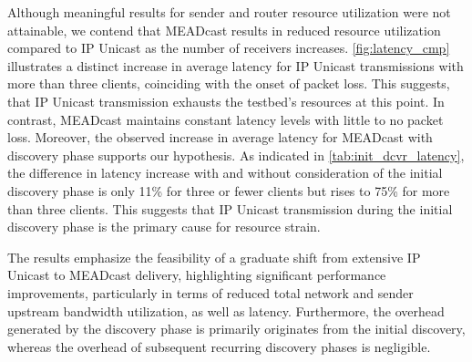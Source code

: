 \begin{itemize}
    Although meaningful results for sender and router resource utilization were
        not attainable, we contend that MEADcast results in reduced resource
        utilization compared to IP Unicast as the number of receivers
        increases.
    \autoref{fig:latency_cmp} illustrates a distinct increase in average
        latency for IP Unicast transmissions with more than three clients,
        coinciding with the onset of packet loss.
    This suggests, that IP Unicast transmission exhausts the testbed's
        resources at this point.
    In contrast, MEADcast maintains constant latency levels with little to no
        packet loss.
    Moreover, the observed increase in average latency for MEADcast with
        discovery phase supports our hypothesis.
    As indicated in \autoref{tab:init_dcvr_latency}, the difference in latency
        increase with and without consideration of the initial discovery phase
        is only 11\% for three or fewer clients but rises to 75\% for more than
        three clients.
    This suggests that IP Unicast transmission during the initial discovery
        phase is the primary cause for resource strain.

    The results emphasize the feasibility of a graduate shift from extensive
        IP Unicast to MEADcast delivery, highlighting significant performance
        improvements, particularly in terms of reduced total network and sender
        upstream bandwidth utilization, as well as latency.
    Furthermore, the overhead generated by the discovery phase is primarily
        originates from the initial discovery, whereas the overhead of
        subsequent recurring discovery phases is negligible.
\end{itemize}

